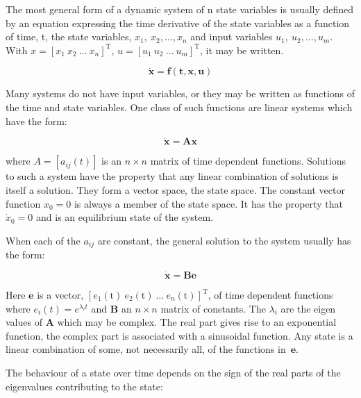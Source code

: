 \documentclass{UoNMCHA}
\numberwithin{equation}{section}
\begin{document}
	The most general form of a dynamic system of n state variables is usually defined by an equation expressing the time derivative of the state variables as a function of time, t, the state variables, $x_1\mathrm{,\ }x_2, …, x_n$ and input variables $u_1\mathrm{,\ }u_2, …, u_m$. With $x=\left[x_1\mathrm{\ } x_2\mathrm{\ } \ldots\mathrm{\ } x_n\right]^\mathrm{T}$, $u=\left[u_1\mathrm{\ } u_2\mathrm{\ } \ldots\mathrm{\ } u_m\right]^\mathrm{T}$, it may be written. 
	
	\begin{equation}
	\mathbf{\dot{x}=f(t,x,u)}
	\end{equation}
	
	Many systems do not have input variables, or they may be written as functions of the time and state variables. One class of such functions are linear systems which have the form:
	
	\begin{equation}
	\mathbf{\dot{x}=Ax}
	\end{equation}
	
	where $A=\left[a_{ij}(t)\right]$ is an $n\times n$ matrix of time dependent functions. Solutions to such a system have the property that any linear combination of solutions is itself a solution. They form a vector space, the state space. The constant vector function $x_0=0$ is always a member of the state space. It has the property that ${\dot{x}}_0=0$ and is an equilibrium state of the system.

	When each of the $a_{ij}$ are constant, the general solution to the system usually has the form: 
	
	\begin{equation}
	\mathbf{\dot{x}=Be}
	\end{equation}
	
	Here $\mathbf{e}$ is a vector, $\left[e_1\mathrm{(t)\ } e_2\mathrm{(t)\ } \ldots\mathrm{\ } e_n\mathrm{(t)} \right]^\mathrm{T}$, of time dependent functions where  $e_i\left(t\right)=e^{\lambda_it}$ and $\mathbf{B}$ an $n\times n$ matrix of constants. The $\lambda_i$ are the eigen values of $\mathbf{A}$ which may be complex. The real part gives rise to an exponential function, the complex part is associated with a sinusoidal function.  Any state is a linear combination of some, not necessarily all, of the functions in\ $\mathbf{e}$.
	
	\newpage
	
	The behaviour of a state over time depends on the sign of the real parts of the eigenvalues contributing to the state:
	
\end{document}
